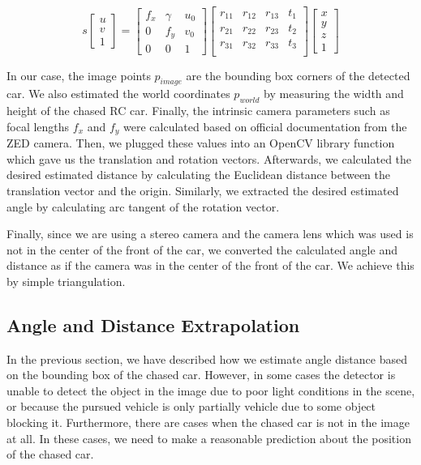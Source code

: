 \begin{equation}
s\begin{bmatrix}u\\v\\1\end{bmatrix} = \begin{bmatrix}
f_x & \gamma & u_0\\
0 & f_y & v_0\\
0 & 0 & 1
\end{bmatrix}\begin{bmatrix}
r_{11} & r_{12} & r_{13} & t_{1}\\
r_{21} & r_{22} & r_{23} & t_{2}\\
r_{31} & r_{32} & r_{33} & t_{3}\\
\end{bmatrix}
\begin{bmatrix}x\\y\\z\\1\end{bmatrix}
\end{equation}

In our case, the image points $p_{image}$ are the bounding box corners of the detected car. We also estimated the world coordinates $p_{world}$ by measuring the width and height of the chased RC car. Finally, the intrinsic camera parameters such as focal lengths $f_x$ and $f_y$ were calculated based on official documentation from the ZED camera. Then, we plugged these values into an OpenCV \cite{opencv_library} library function which gave us the translation and rotation vectors. Afterwards, we calculated the desired estimated distance by calculating the Euclidean distance between the translation vector and the origin. Similarly, we extracted the desired estimated angle by calculating arc tangent of the rotation vector. 

Finally, since we are using a stereo camera and the camera lens which was used is not in the center of the front of the car, we converted the calculated angle and distance as if the camera was in the center of the front of the car. We achieve this by simple triangulation.

\subsection{Angle and Distance Extrapolation}
In the previous section, we have described how we estimate angle distance based on the bounding box of the chased car. However, in some cases the detector is unable to detect the object in the image due to poor light conditions in the scene, or because the pursued vehicle is only partially vehicle due to some object blocking it. Furthermore, there are cases when the chased car is not in the image at all. In these cases, we need to make a reasonable prediction about the position of the chased car. \par


